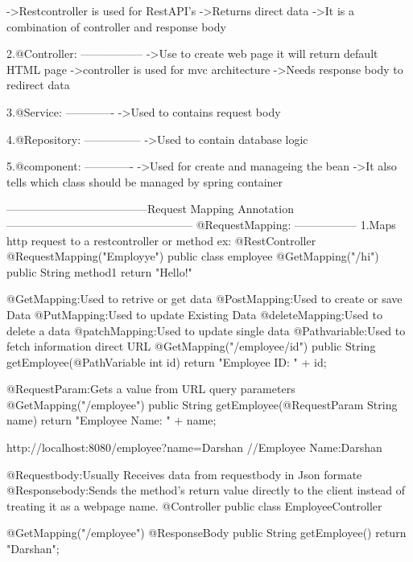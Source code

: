 							->Restcontroller is used for RestAPI's
							->Returns direct data
							->It is a combination of controller and response body
							
							
				2.@Controller:
				-----------------
						->Use to create web page it will return default HTML page
						->controller is used for mvc architecture
						->Needs response body to redirect data
						
				3.@Service:
				-------------
						->Used to contains request body
						
				4.@Repository:
				---------------
						->Used to contain database logic 
						
				5.@component:
				-------------
						->Used for create and manageing the bean
						->It also tells which class should be managed by spring container
						
						
				--------------------------------------Request Mapping Annotation--------------------------------------------------
				@RequestMapping:
				-----------------
						1.Maps http request to a restcontroller or method
					ex:
							@RestController
							@RequestMapping("Employye")
							public class employee{
								@GetMapping("/hi")
								public String method1{
								return "Hello!"
								}
							}
							
							
				@GetMapping:Used to retrive or get data
				@PostMapping:Used to create or save Data
				@PutMapping:Used to update Existing Data
				@deleteMapping:Used to delete a data
				@patchMapping:Used to update single data
				@Pathvariable:Used to fetch information direct URL
					@GetMapping("/employee/{id}")
							public String getEmployee(@PathVariable int id) {
								return "Employee ID: " + id;
							}
							
				@RequestParam:Gets a value from URL query parameters
				@GetMapping("/employee")
					public String getEmployee(@RequestParam String name) {
						return "Employee Name: " + name;
					}		
					
					http://localhost:8080/employee?name=Darshan //Employee Name:Darshan
					
				@Requestbody:Usually Receives data from requestbody in Json formate
				@Responsebody:Sends the method's return value directly to the client instead of treating it as a webpage name.
				@Controller
					public class EmployeeController {


						@GetMapping("/employee")
						@ResponseBody
						public String getEmployee() {
							return "Darshan";
						}
					}



